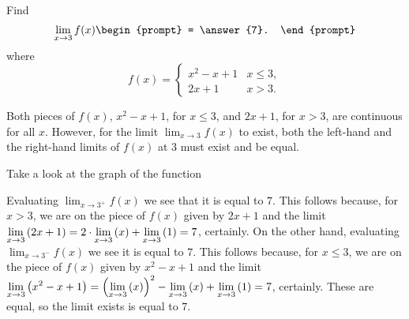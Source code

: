 \documentclass{ximera}
\author{Gregory Hartman \and Matthew Carr}
\begin{document}
\begin{exercise}



 Find 
  \[
  \lim_{x\to 3} f(x)
  \begin{prompt}
  = \answer{7}.
  \end{prompt}
  \]
  where
  \[
  f(x) = \left\{\begin{array}{cl} x^2-x+1 & x\leq 3, \\ 2x+1 & x>3. \end{array}\right.
  \]
    \begin{hint}
     Both pieces of $f(x)$, $x^2-x+1$, for $x\leq3$, and $2x+1$, for $x>3$, are continuous for all $x$. However, for the limit $\lim_{x\to3}f(x)$ to exist, both the left-hand and the right-hand limits of $f(x)$ at $3$ must exist and be equal.
    \end{hint}
     \begin{hint}
    	Take a look at the graph of the function
    \begin{center}
      \end{center} 
    \end{hint}
    \begin{hint}
     Evaluating $\lim_{x\to3^{+}}f(x)$ we see that it is equal to $7$. This follows because, for $x>3$, we are on the piece of $f(x)$ given by $2x+1$ and the limit $\lim_{x\to3}\p{2x+1}=2\cdot\lim_{x\to 3}\p{x}+\lim_{x\to3}\p{1}=7$, certainly. On the other hand, evaluating $\lim_{x\to3^{-}}f(x)$ we see it is equal to $7$. This follows because, for $x\leq3$, we are on the piece of $f(x)$ given by $x^2-x+1$ and the limit $\lim_{x\to3}\p{x^2-x+1}=\p{\lim_{x\to3}\p{x}}^2-\lim_{x\to 3}\p{x}+\lim_{x\to3}\p{1}=7$, certainly. These are equal, so the limit exists is equal to $7$.
    \end{hint}
\end{exercise}
\end{document}
